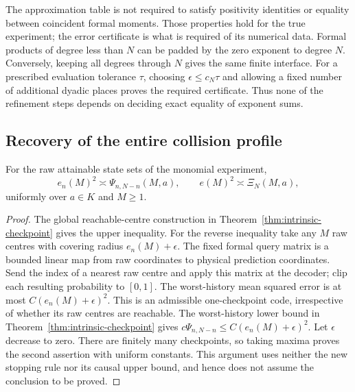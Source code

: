 The approximation table is not required to satisfy positivity identities
or equality between coincident formal moments. Those properties hold for
the true experiment; the error certificate is what is required of its
numerical data. Formal products of degree less than $N$ can be padded
by the zero exponent to degree $N$. Conversely, keeping all degrees
through $N$ gives the same finite interface. For a prescribed evaluation
tolerance $\tau$, choosing $\epsilon\le c_N\tau$ and allowing a fixed
number of additional dyadic places proves the required certificate.
Thus none of the refinement steps depends on deciding exact equality
of exponent sums.

\subsection{Recovery of the entire collision profile}
\begin{lemma}\label{lem:cover-profile}
For the raw attainable state sets of the monomial experiment,
\begin{equation}\label{eq:cover-profile}
 e_n(M)^2\asymp\Psi_{n,N-n}(M,a),\qquad
 e(M)^2\asymp\Xi_N(M,a),
\end{equation}
uniformly over $a\in K$ and $M\ge1$.
\end{lemma}
\begin{proof}
The global reachable-centre construction in
Theorem~\ref{thm:intrinsic-checkpoint} gives the upper inequality.
For the reverse inequality take any $M$ raw centres with covering radius
$e_n(M)+\epsilon$. The fixed formal query matrix is a bounded linear
map from raw coordinates to physical prediction coordinates. Send the
index of a nearest raw centre and apply this matrix at the decoder;
clip each resulting probability to $[0,1]$. The worst-history mean
squared error is at most $C(e_n(M)+\epsilon)^2$. This is an admissible
one-checkpoint code, irrespective of whether its raw centres are
reachable. The worst-history lower bound in
Theorem~\ref{thm:intrinsic-checkpoint} gives
$c\Psi_{n,N-n}\le C(e_n(M)+\epsilon)^2$.
Let $\epsilon$ decrease to zero. There are finitely many checkpoints,
so taking maxima proves the second assertion with uniform constants.
This argument uses neither the new stopping rule nor its causal upper
bound, and hence does not assume the conclusion to be proved.
\end{proof}

